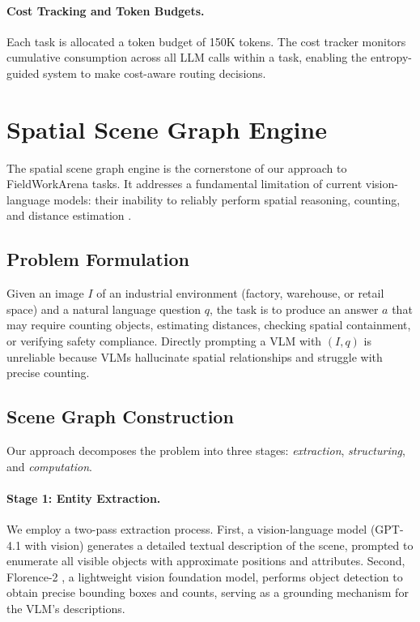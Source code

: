 \documentclass[11pt]{article}
\begin{document}
\paragraph{Cost Tracking and Token Budgets.} Each task is allocated a token budget of 150K tokens. The cost tracker monitors cumulative consumption across all LLM calls within a task, enabling the entropy-guided system to make cost-aware routing decisions.

\section{Spatial Scene Graph Engine}
\label{sec:spatial}

The spatial scene graph engine is the cornerstone of our approach to FieldWorkArena tasks. It addresses a fundamental limitation of current vision-language models: their inability to reliably perform spatial reasoning, counting, and distance estimation \citep{chen2024spatialvlm, li2023evaluating}.

\subsection{Problem Formulation}

Given an image $I$ of an industrial environment (factory, warehouse, or retail space) and a natural language question $q$, the task is to produce an answer $a$ that may require counting objects, estimating distances, checking spatial containment, or verifying safety compliance. Directly prompting a VLM with $(I, q)$ is unreliable because VLMs hallucinate spatial relationships and struggle with precise counting.

\subsection{Scene Graph Construction}

Our approach decomposes the problem into three stages: \emph{extraction}, \emph{structuring}, and \emph{computation}.

\paragraph{Stage 1: Entity Extraction.}
We employ a two-pass extraction process. First, a vision-language model (GPT-4.1 with vision) generates a detailed textual description of the scene, prompted to enumerate all visible objects with approximate positions and attributes. Second, Florence-2 \citep{xiao2024florence2}, a lightweight vision foundation model, performs object detection to obtain precise bounding boxes and counts, serving as a grounding mechanism for the VLM's descriptions.
\end{document}
